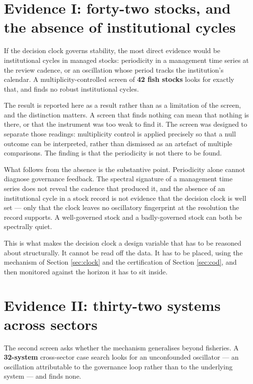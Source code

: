\section{Evidence I: forty-two stocks, and the absence of institutional cycles}
\label{sec:42}

If the decision clock governs stability, the most direct evidence would be institutional
cycles in managed stocks: periodicity in a management time series at the review cadence,
or an oscillation whose period tracks the institution's calendar. A
multiplicity-controlled screen of \textbf{42 fish stocks} looks for exactly that, and
finds no robust institutional cycles.

The result is reported here as a result rather than as a limitation of the screen, and the
distinction matters. A screen that finds nothing can mean that nothing is there, or that
the instrument was too weak to find it. The screen was designed to separate those
readings: multiplicity control is applied precisely so that a null outcome can be
interpreted, rather than dismissed as an artefact of multiple comparisons. The finding is
that the periodicity is not there to be found.

What follows from the absence is the substantive point. Periodicity alone cannot diagnose
governance feedback. The spectral signature of a management time series does not reveal
the cadence that produced it, and the absence of an institutional cycle in a stock record
is not evidence that the decision clock is well set --- only that the clock leaves no
oscillatory fingerprint at the resolution the record supports. A well-governed stock and a
badly-governed stock can both be spectrally quiet.

This is what makes the decision clock a design variable that has to be reasoned about
structurally. It cannot be read off the data. It has to be placed, using the mechanism of
Section \ref{sec:clock} and the certification of Section \ref{sec:cod}, and then monitored
against the horizon it has to sit inside.

\section{Evidence II: thirty-two systems across sectors}
\label{sec:32}

The second screen asks whether the mechanism generalises beyond fisheries. A
\textbf{32-system} cross-sector case search looks for an unconfounded oscillator --- an
oscillation attributable to the governance loop rather than to the underlying system ---
and finds none.

